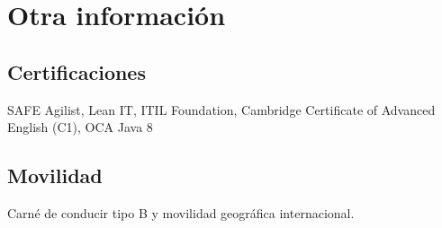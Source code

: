 \documentclass[letterpaper]{twentysecondcv} %
\begin{document}

\section{Otra información}
\subsection{Certificaciones}
SAFE Agilist, Lean IT, ITIL Foundation, Cambridge Certificate of Advanced English (C1), OCA Java 8
\subsection{Movilidad}
Carné de conducir tipo B y movilidad geográfica internacional.







\end{document}
